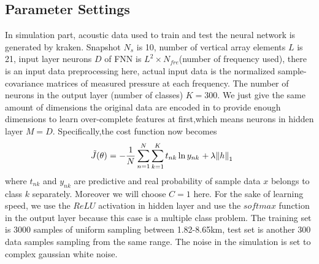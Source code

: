 \subsection{Parameter Settings}
In simulation part, acoustic data used to train and test the neural network is generated by kraken. Snapshot $N_{s}$ is 10, number of vertical array elements $L$ is 21, input layer neurons $D$ of FNN is $L^{2} \times N_{fre}$(number of frequency used), there is an input data preprocessing here, actual input data is the normalized sample-covariance matrices of measured pressure at each frequency. The number of neurons in the output layer (number of classes) $K = 300$. We just give the same amount of dimensions the original data are encoded in to provide enough dimensions to learn over-complete features at first,which means neurons in hidden layer $M = D$. Specifically,the cost function now becomes
\begin{equation}
{\kern 1pt} {\kern 1pt} {\kern 1pt} {\kern 1pt} {\kern 1pt} {\kern 1pt} \tilde J(\theta ){\kern 1pt} {\kern 1pt} {\kern 1pt} {\rm{ = }}{\kern 1pt} {\kern 1pt} {\kern 1pt} {\rm{ - }}{{\rm{1}} \over N}\sum\limits_{n = 1}^N {\sum\limits_{k = 1}^K {{t_{nk}}\ln {y_{nk}}{\kern 1pt} {\kern 1pt} {\kern 1pt} {\rm{ + }}{\kern 1pt} {\kern 1pt} \lambda {{\left\| h \right\|}_1}} }
\end{equation}
where $t_{nk}$ and $y_{nk}$ are predictive and real probability of sample data $x$ belongs to class $k$ separately. Moreover we will choose $C=1$ here.
For the sake of learning speed, we use the $ReLU$ activation in hidden layer and use the $softmax$
function in the output layer because this case is a multiple class problem.
The training set is 3000 samples of uniform sampling between 1.82\--8.65km, test set is another 300 data samples sampling from the same range. The noise in the simulation is set to complex gaussian white noise.

